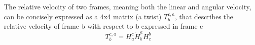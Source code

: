 The relative velocity of two frames, meaning both the linear and angular velocity, can be concisely expressed as a 4x4 matrix (a twist) $T^{c,a}_b$, that describes the relative velocity of frame b with respect to b expressed in frame c
\begin{equation}
T^{c,a}_b = H^c_a \dot{H}^a_b H^b_c
\end{equation}